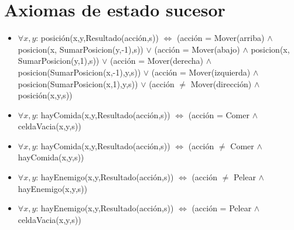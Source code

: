 \section{Axiomas de estado sucesor}

\begin{itemize}

\item $\forall x,y$: posición(x,y,Resultado(acción,s)) $\Leftrightarrow$
\newline (acción = Mover(arriba) $\land$ posicion(x, SumarPosicion(y,-1),s))
\newline $\lor$
\newline (acción = Mover(abajo) $\land$ posicion(x, SumarPosicion(y,1),s))
\newline $\lor$
\newline (acción = Mover(derecha) $\land$ posicion(SumarPosicion(x,-1),y,s))
\newline $\lor$
\newline (acción = Mover(izquierda) $\land$ posicion(SumarPosicion(x,1),y,s))
\newline $\lor$
\newline (acción $\ne$ Mover(dirección) $\land$ posición(x,y,s))

\item $\forall x,y$: hayComida(x,y,Resultado(acción,s)) $\Leftrightarrow$
\newline (acción = Comer $\land$ celdaVacia(x,y,s))

\item $\forall x,y$: hayComida(x,y,Resultado(acción,s)) $\Leftrightarrow$
\newline (acción $\ne$ Comer $\land$ hayComida(x,y,s))

\item $\forall x,y$: hayEnemigo(x,y,Resultado(acción,s)) $\Leftrightarrow$
\newline (acción $\ne$ Pelear $\land$ hayEnemigo(x,y,s))

\item $\forall x,y$: hayEnemigo(x,y,Resultado(acción,s)) $\Leftrightarrow$
\newline (acción = Pelear $\land$ celdaVacia(x,y,s))

\end{itemize}

